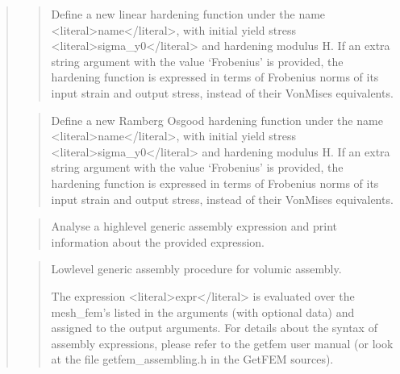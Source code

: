 \documentclass[a4paper,11pt,english]{sphinxmanual}
\begin{document}
\begin{quote}
\begin{quote}
\sphinxAtStartPar
Define a new linear hardening function under the name \textless{}literal\textgreater{}name\textless{}/literal\textgreater{}, with
initial yield stress \textless{}literal\textgreater{}sigma\_y0\textless{}/literal\textgreater{} and hardening modulus H.
If an extra string argument with the value ‘Frobenius’ is provided,
the hardening function is expressed in terms of Frobenius norms of its
input strain and output stress, instead of their Von\sphinxhyphen{}Mises equivalents.
\end{quote}

\sphinxAtStartPar
{}
\begin{quote}

\sphinxAtStartPar
Define a new Ramberg Osgood hardening function under the name \textless{}literal\textgreater{}name\textless{}/literal\textgreater{},
with initial yield stress \textless{}literal\textgreater{}sigma\_y0\textless{}/literal\textgreater{} and hardening modulus H.
If an extra string argument with the value ‘Frobenius’ is provided,
the hardening function is expressed in terms of Frobenius norms of its
input strain and output stress, instead of their Von\sphinxhyphen{}Mises equivalents.
\end{quote}

\sphinxAtStartPar
{}
\begin{quote}

\sphinxAtStartPar
Analyse a high\sphinxhyphen{}level generic assembly expression and print
information about the provided expression.
\end{quote}

\sphinxAtStartPar
{}
\begin{quote}

\sphinxAtStartPar
Low\sphinxhyphen{}level generic assembly procedure for volumic assembly.

\sphinxAtStartPar
The expression \textless{}literal\textgreater{}expr\textless{}/literal\textgreater{} is evaluated over the mesh\_fem’s listed in the
arguments (with optional data) and assigned to the output arguments.
For details about the syntax of assembly expressions, please refer
to the getfem user manual (or look at the file getfem\_assembling.h
in the GetFEM sources).


\end{quote}
\end{quote}
\end{document}
